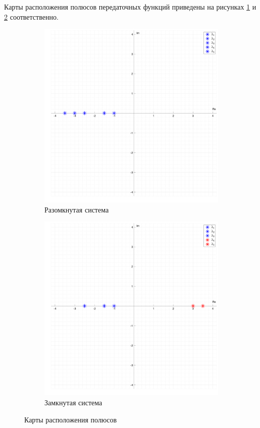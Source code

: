Карты расположения полюсов передаточных функций приведены на рисунках \ref{fig:task2_poles:open} и \ref{fig:task2_poles:closed} соответственно.
\begin{figure}
    \centering
    \begin{subfigure}{0.5\textwidth}
        \includegraphics[width=\textwidth]{media/plots/task2_poles_open.png}
        \caption{Разомкнутая система}
        \label{fig:task2_poles:open}
    \end{subfigure}%
    \begin{subfigure}{0.5\textwidth}
        \includegraphics[width=\textwidth]{media/plots/task2_poles_closed.png}
        \caption{Замкнутая система}
        \label{fig:task2_poles:closed}
    \end{subfigure}
    \caption{Карты расположения полюсов}
    \label{fig:task2_poles}
\end{figure}

